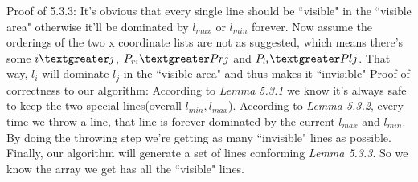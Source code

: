 \documentclass[11pt]{article}
\begin{document}
	\newline
	Proof of 5.3.3: It's obvious that every single line should be ``visible" in the ``visible area" otherwise it'll be dominated by $l_{max}$ or $l_{min}$ forever. Now assume the orderings of the two x coordinate lists are not as suggested, which means there's some $i\textgreater j$, $P_{ri}\textgreater P{rj}$ and $P_{li}\textgreater P{lj}$. That way, $l_{i}$ will dominate $l_{j}$ in the ``visible area" and thus makes it ``invisible"\newline
	\newline
	Proof of correctness to our algorithm: According to \textit{Lemma 5.3.1} we know it's always safe to keep the two special lines(overall $l_{min}, l_{max}$). According to \textit{Lemma 5.3.2}, every time we throw a line, that line is forever dominated by the current $l_{max}$ and $l_{min}$. By doing the throwing step we're getting as many ``invisible" lines as possible. Finally, our algorithm will generate a set of lines conforming \textit{Lemma 5.3.3}. So we know the array we get has all the ``visible" lines.
	
\end{document}
